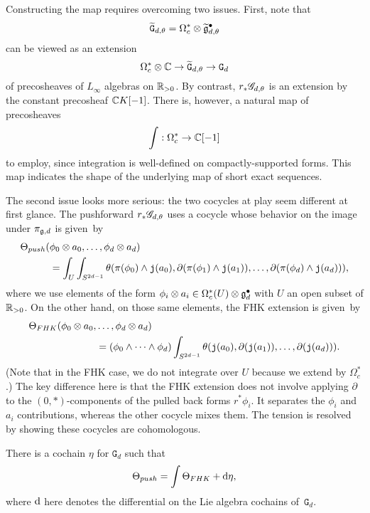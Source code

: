 Constructing the map requires overcoming two issues.
First, note that 
\[
\widetilde{\mathtt{G}}_{d,\theta} = \Omega^*_c \otimes \widetilde{\mathfrak g}^\bullet_{d,\theta}
\]
can be viewed as an extension
\[
\Omega^*_c \otimes \mathbb C \to \widetilde{\mathtt{G}}_{d,\theta} \to \mathtt{G}_d
\]
of precosheaves of $L_\infty$ algebras on $\mathbb R_{>0}$.
By contrast, $r_* \mathscr G_{d,\theta}$ is an extension by the constant precosheaf $\mathbb C K[-1]$.
There is, however, a natural map of precosheaves
\[
\int: \Omega^*_c \to \mathbb C[-1]
\]
to employ, since integration is well-defined on compactly-supported forms.
This map indicates the shape of the underlying map of short exact sequences.

The second issue looks more serious:
the two cocycles at play seem different at first glance.
The pushforward $r_* \mathscr G_{d,\theta}$ uses a cocycle whose behavior on the image under $\pi_{\mathfrak g, d}$ is given~by
\begin{align*}
\Theta_{push}(&\phi_0 \otimes a_0, \ldots, \phi_d \otimes a_d) \\
&= \int_U \int_{S^{2d-1}} \theta(\pi(\phi_0) \wedge {\mathtt{j}}(a_0),\partial (\pi(\phi_1) \wedge {\mathtt{j}}(a_1)),\ldots,\partial(\pi(\phi_d) \wedge {\mathtt{j}}(a_d))),
\end{align*}
where we use  elements of the form $\phi_i \otimes a_i \in \Omega^*_c(U) \otimes \mathfrak g^\bullet_d$ with $U$ an open subset of $\mathbb R_{>0}$.
On the other hand, on those same elements, the FHK extension is given~by
\begin{align*}
\Theta_{FHK}(\phi_0 \otimes a_0, &\ldots, \phi_d \otimes a_d) \\
&= (\phi_0 \wedge \cdots \wedge \phi_d) \int_{S^{2d-1}} \theta({\mathtt{j}}(a_0),\partial ({\mathtt{j}}(a_1)),\ldots,\partial({\mathtt{j}}(a_d))).
\end{align*}
(Note that in the FHK case, we do not integrate over $U$ because we extend by $\Omega^*_c$.)
The key difference here is that the FHK extension does not involve applying $\partial$ to the $(0,*)$-components of the pulled back forms $r^* \phi_i$.
It separates the $\phi_i$ and $a_i$ contributions,
whereas the other cocycle mixes them.
The tension is resolved by showing these cocycles are cohomologous.

\begin{lem}
There is a cochain $\eta$ for $\mathtt{G}_d$ such that
\[
\Theta_{push} = \int \Theta_{FHK} + {\rm d} \eta,
\]
where ${\rm d}$ here denotes the differential on the Lie algebra cochains of~$\mathtt{G}_d$.
\end{lem}


